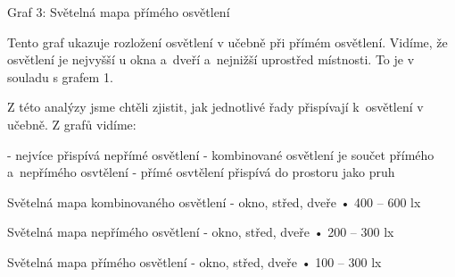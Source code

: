 Graf 3: Světelná mapa přímého osvětlení

Tento graf ukazuje rozložení osvětlení v učebně při přímém osvětlení. Vidíme, že osvětlení je nejvyšší
u okna a~dveří a~nejnižší uprostřed místnosti. To je v souladu s grafem 1.

Z této analýzy jsme chtěli zjistit, jak jednotlivé řady přispívají k~osvětlení v učebně. Z grafů vidíme:

- nejvíce přispívá nepřímé osvětlení
- kombinované osvětlení je součet přímého a~nepřímého osvtělení
- přímé osvtělení přispívá do prostoru jako pruh

Světelná mapa kombinovaného osvětlení - okno, střed, dveře
    • 400 – 600 lx

Světelná mapa nepřímého osvětlení - okno, střed, dveře
    • 200 – 300 lx

Světelná mapa přímého osvětlení - okno, střed, dveře
    • 100 – 300 lx